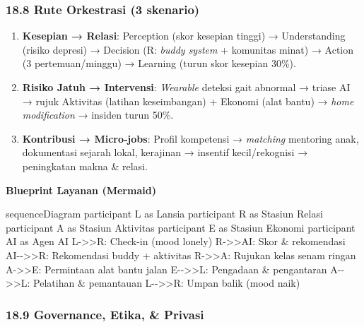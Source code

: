 \documentclass[
  letterpaper,
  DIV=11,
  numbers=noendperiod]{scrartcl}
\newenvironment{Shaded}{\begin{snugshade}}{\end{snugshade}}
\newcommand{\NormalTok}[1]{\textcolor[rgb]{0.00,0.23,0.31}{#1}}
\providecommand{\tightlist}{%
  \setlength{\itemsep}{0pt}\setlength{\parskip}{0pt}}
\begin{document}
\subsubsection{18.8 Rute Orkestrasi (3
skenario)}\label{rute-orkestrasi-3-skenario}

\begin{enumerate}
\def\labelenumi{\arabic{enumi}.}
\tightlist
\item
  \textbf{Kesepian → Relasi}: Perception (skor kesepian tinggi) →
  Understanding (risiko depresi) → Decision (R: \emph{buddy system} +
  komunitas minat) → Action (3 pertemuan/minggu) → Learning (turun skor
  kesepian 30\%).
\item
  \textbf{Risiko Jatuh → Intervensi}: \emph{Wearable} deteksi gait
  abnormal → triase AI → rujuk Aktivitas (latihan keseimbangan) +
  Ekonomi (alat bantu) → \emph{home modification} → insiden turun 50\%.
\item
  \textbf{Kontribusi → Micro‑jobs}: Profil kompetensi → \emph{matching}
  mentoring anak, dokumentasi sejarah lokal, kerajinan → insentif
  kecil/rekognisi → peningkatan makna \& relasi.
\end{enumerate}

\textbf{Blueprint Layanan (Mermaid)}

\begin{Shaded}
\begin{Highlighting}[]
\NormalTok{sequenceDiagram}
\NormalTok{  participant L as Lansia}
\NormalTok{  participant R as Stasiun Relasi}
\NormalTok{  participant A as Stasiun Aktivitas}
\NormalTok{  participant E as Stasiun Ekonomi}
\NormalTok{  participant AI as Agen AI}
\NormalTok{  L{-}\textgreater{}\textgreater{}R: Check{-}in (mood lonely)}
\NormalTok{  R{-}\textgreater{}\textgreater{}AI: Skor \& rekomendasi}
\NormalTok{  AI{-}{-}\textgreater{}\textgreater{}R: Rekomendasi buddy + aktivitas}
\NormalTok{  R{-}\textgreater{}\textgreater{}A: Rujukan kelas senam ringan}
\NormalTok{  A{-}\textgreater{}\textgreater{}E: Permintaan alat bantu jalan}
\NormalTok{  E{-}{-}\textgreater{}\textgreater{}L: Pengadaan \& pengantaran}
\NormalTok{  A{-}{-}\textgreater{}\textgreater{}L: Pelatihan \& pemantauan}
\NormalTok{  L{-}{-}\textgreater{}\textgreater{}R: Umpan balik (mood naik)}
\end{Highlighting}
\end{Shaded}

\subsubsection{18.9 Governance, Etika, \&
Privasi}\label{governance-etika-privasi}
\end{document}
